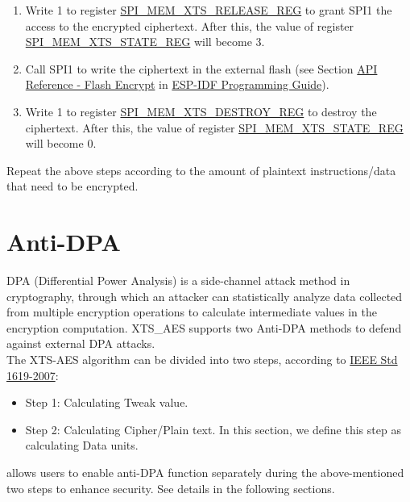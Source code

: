 \documentclass[main\_\_EN.tex]{subfiles}
\begin{document}
\begin{enumerate}
    \item Write 1 to register \hyperref[regdesc:SPIMEMXTSRELEASEREG]{SPI\_MEM\_XTS\_RELEASE\_REG} to grant SPI1 the access to the encrypted ciphertext. After this, the value of register \hyperref[regdesc:SPIMEMXTSSTATEREG]{SPI\_MEM\_XTS\_STATE\_REG} will become 3.

    \item Call SPI1 to write the ciphertext in the external flash (see Section \href{https://docs.espressif.com/projects/esp-idf/en/latest/esp32c6/api-reference/peripherals/spi_flash/index.html#api-reference-flash-encrypt}{API Reference - Flash Encrypt} in \href{https://docs.espressif.com/projects/esp-idf/en/latest/esp32h2/index.html}{ESP-IDF Programming Guide}).

    \item Write 1 to register \hyperref[regdesc:SPIMEMXTSDESTROYREG]{SPI\_MEM\_XTS\_DESTROY\_REG} to destroy the ciphertext. After this, the value of register \hyperref[regdesc:SPIMEMXTSSTATEREG]{SPI\_MEM\_XTS\_STATE\_REG} will become 0.

\end{enumerate}

Repeat the above steps according to the amount of plaintext instructions/data that need to be encrypted.



\section{Anti-DPA}
DPA (Differential Power Analysis) is a side-channel attack method in cryptography, through which an attacker can statistically analyze data collected from multiple encryption operations to calculate intermediate values in the encryption computation. \chipname{} XTS\_AES supports two Anti-DPA methods to defend against external DPA attacks. \\

The XTS-AES algorithm can be divided into two steps, according to \href{https://ieeexplore.ieee.org/document/4493450}{IEEE Std 1619-2007}:
\begin{itemize}
    \item Step 1: Calculating Tweak value.
    \item Step 2: Calculating Cipher/Plain text. In this section, we define this step as calculating Data units.
\end{itemize}

\chipname{} allows users to enable anti-DPA function separately during the above-mentioned two steps to enhance security. See details in the following sections.
\end{document}
